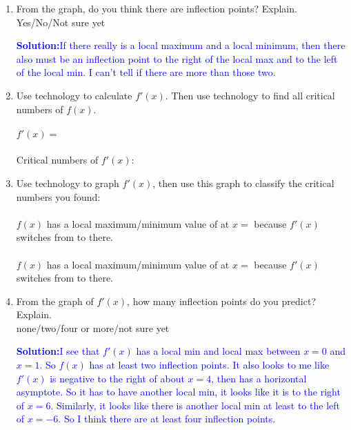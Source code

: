 \documentclass[letterpaper,11pt]{article}
\newcommand{\sol}[2]{\begin{minipage}[c][#1]{\linewidth}{\textcolor{blue}{\textbf{Solution:}}\quad \textcolor{blue}{#2}}\end{minipage}}
\newcommand{\sol}[2]{\begin{minipage}[c][#1]{\linewidth}{\vfill}\end{minipage}}
\begin{document}
\begin{enumerate}
\sol{.6in}{It looks like the curve is positive past about $x=2$, then there is a horizontal asymptote.  So there must be a local max somewhere to the right of that positive $x$-intercept. Similarly, it looks like there is local min somewhere to the left of the negative $x$-intercept}.

\item From the graph, do you think there are inflection points? Explain.  Yes/No/Not sure yet

\sol{.6in}{If there really is a local maximum and a local minimum, then there also must be an inflection point to the right of the local max and to the left of the local min.  I can't tell if there are more than those two.}

\newpage

\item Use technology to calculate $f'(x)$. Then use technology to find all critical numbers of $f(x)$.\\\\
$f'(x) = $\\\\
Critical numbers of $f'(x)$: \\

\item  Use technology to graph $f'(x)$, then use this graph to classify the critical numbers you found:\\\\
$f(x)$ has a local maximum/minimum value of \underline{\hspace{1in}} at $x=$\underline{\hspace{1in}} because $f'(x)$ switches from \underline{\hspace{1in}} to \underline{\hspace{1in}} there.\\\\
$f(x)$ has a local maximum/minimum value of \underline{\hspace{1in}} at $x=$\underline{\hspace{1in}} because $f'(x)$ switches from \underline{\hspace{1in}} to \underline{\hspace{1in}} there.\\

\item  From the graph of $f'(x)$, how many inflection points do you predict? Explain.\\  none/two/four or more/not sure yet

\sol{1in}{I see that $f'(x)$ has a local min and local max between $x=0$ and $x=1$. So $f(x)$ has at least two inflection points. It also looks to me like $f'(x)$ is negative to the right of about $x=4$, then has a horizontal asymptote.  So it has to have another local min, it looks like it is to the right of $x=6$. Similarly, it looks like there is another local min at least to the left of $x=-6$. So I think there are at least four inflection points.}


\end{enumerate}
\end{document}
